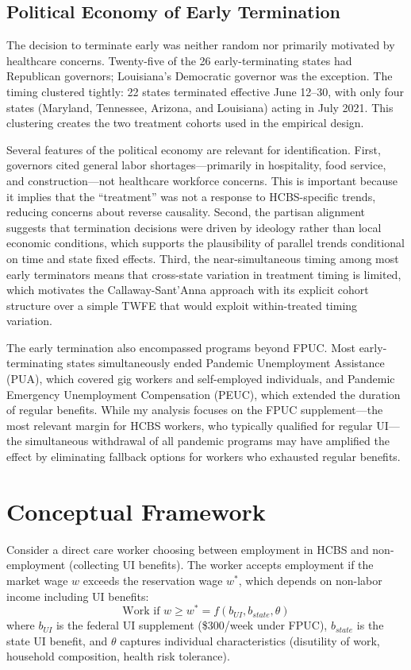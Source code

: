 \documentclass[12pt]{article}
\begin{document}
\subsection{Political Economy of Early Termination}

The decision to terminate early was neither random nor primarily motivated by healthcare concerns. Twenty-five of the 26 early-terminating states had Republican governors; Louisiana's Democratic governor was the exception. The timing clustered tightly: 22 states terminated effective June 12--30, with only four states (Maryland, Tennessee, Arizona, and Louisiana) acting in July 2021. This clustering creates the two treatment cohorts used in the empirical design.

Several features of the political economy are relevant for identification. First, governors cited general labor shortages---primarily in hospitality, food service, and construction---not healthcare workforce concerns. This is important because it implies that the ``treatment'' was not a response to HCBS-specific trends, reducing concerns about reverse causality. Second, the partisan alignment suggests that termination decisions were driven by ideology rather than local economic conditions, which supports the plausibility of parallel trends conditional on time and state fixed effects. Third, the near-simultaneous timing among most early terminators means that cross-state variation in treatment timing is limited, which motivates the Callaway-Sant'Anna approach with its explicit cohort structure over a simple TWFE that would exploit within-treated timing variation.

The early termination also encompassed programs beyond FPUC. Most early-terminating states simultaneously ended Pandemic Unemployment Assistance (PUA), which covered gig workers and self-employed individuals, and Pandemic Emergency Unemployment Compensation (PEUC), which extended the duration of regular benefits. While my analysis focuses on the FPUC supplement---the most relevant margin for HCBS workers, who typically qualified for regular UI---the simultaneous withdrawal of all pandemic programs may have amplified the effect by eliminating fallback options for workers who exhausted regular benefits.


\section{Conceptual Framework}

Consider a direct care worker choosing between employment in HCBS and non-employment (collecting UI benefits). The worker accepts employment if the market wage $w$ exceeds the reservation wage $w^*$, which depends on non-labor income including UI benefits:
\begin{equation}
\text{Work if } w \geq w^* = f(b_{UI}, b_{state}, \theta)
\end{equation}
where $b_{UI}$ is the federal UI supplement (\$300/week under FPUC), $b_{state}$ is the state UI benefit, and $\theta$ captures individual characteristics (disutility of work, household composition, health risk tolerance).
\end{document}
